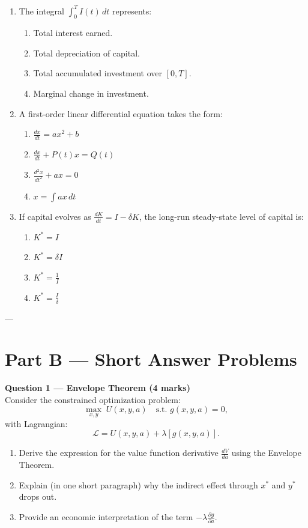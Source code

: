\documentclass[12pt]{article}
\begin{document}
\begin{enumerate}
\item The integral $\displaystyle \int_0^T I(t)\, dt$ represents:
\begin{enumerate}
\item Total interest earned.
\item Total depreciation of capital.
\item Total accumulated investment over $[0,T]$.
\item Marginal change in investment.
\end{enumerate}

\item A first-order linear differential equation takes the form:
\begin{enumerate}
\item $\displaystyle \frac{dx}{dt} = a x^2 + b$
\item $\displaystyle \frac{dx}{dt} + P(t)x = Q(t)$
\item $\displaystyle \frac{d^2x}{dt^2} + ax = 0$
\item $\displaystyle x = \int ax \, dt$
\end{enumerate}

\item If capital evolves as $\frac{dK}{dt}=I-\delta K$, the long-run steady-state level of capital is:
\begin{enumerate}
\item $K^* = I$
\item $K^* = \delta I$
\item $K^* = \frac{1}{I}$
\item $K^* = \frac{I}{\delta}$
\end{enumerate}

\end{enumerate}

---

\section*{Part B — Short Answer Problems}

\textbf{Question 1 — Envelope Theorem (4 marks)}\\
Consider the constrained optimization problem:
\[
\max_{x,y} \; U(x,y,a) \quad \text{s.t. } g(x,y,a)=0,
\]
with Lagrangian:
\[
\mathcal{L}=U(x,y,a)+\lambda[g(x,y,a)].
\]

\begin{enumerate}
\item Derive the expression for the value function derivative $\frac{dV}{da}$ using the Envelope Theorem.  
\item Explain (in one short paragraph) why the indirect effect through $x^*$ and $y^*$ drops out.  
\item Provide an economic interpretation of the term $-\lambda \frac{\partial g}{\partial a}$.  
\end{enumerate}
\end{document}
